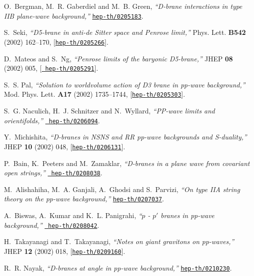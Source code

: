 \documentclass[a4paper,12pt]{article}
\numberwithin{equation}{section}
\begin{document}
\begin{thebibliography}{10}
O.~Bergman, M.~R. Gaberdiel and M.~B. Green, {\it ``{D}-brane interactions in
  type {IIB} plane-wave background,''}
  \href{http://arXiv.org/abs/hep-th/0205183}{{\tt hep-th/0205183}}.

S.~Seki, {\it ``{D}5-brane in anti-de {S}itter space and {P}enrose limit,''}
  Phys. Lett. {\bf B542} (2002) 162--170,
  [\href{http://arXiv.org/abs/hep-th/0205266}{{\tt hep-th/0205266}}].

D.~Mateos and S.~Ng, {\it ``{P}enrose limits of the baryonic {D}5-brane,''}
  JHEP {\bf 08} (2002) 005, [\href{http://arXiv.org/abs/hep-th/0205291}{{\tt
  hep-th/0205291}}].

S.~S. Pal, {\it ``Solution to worldvolume action of {D}3 brane in pp-wave
  background,''}  Mod. Phys. Lett. {\bf A17} (2002) 1735--1744,
  [\href{http://arXiv.org/abs/hep-th/0205303}{{\tt hep-th/0205303}}].

S.~G. Naculich, H.~J. Schnitzer and N.~Wyllard, {\it ``{PP}-wave limits and
  orientifolds,''}  \href{http://arXiv.org/abs/hep-th/0206094}{{\tt
  hep-th/0206094}}.

Y.~Michishita, {\it ``{D}-branes in {NSNS} and {RR} pp-wave backgrounds and
  {S}-duality,''}  JHEP {\bf 10} (2002) 048,
  [\href{http://arXiv.org/abs/hep-th/0206131}{{\tt hep-th/0206131}}].

P.~Bain, K.~Peeters and M.~Zamaklar, {\it ``{D}-branes in a plane wave from
  covariant open strings,''}  \href{http://arXiv.org/abs/hep-th/0208038}{{\tt
  hep-th/0208038}}.

M.~Alishahiha, M.~A. Ganjali, A.~Ghodsi and S.~Parvizi, {\it ``On type {IIA}
  string theory on the pp-wave background,''}
  \href{http://arXiv.org/abs/hep-th/0207037}{{\tt hep-th/0207037}}.

A.~Biswas, A.~Kumar and K.~L. Panigrahi, {\it ``{$p$ - $p'$} branes in pp-wave
  background,''}  \href{http://arXiv.org/abs/hep-th/0208042}{{\tt
  hep-th/0208042}}.

H.~Takayanagi and T.~Takayanagi, {\it ``Notes on giant gravitons on
  pp-waves,''}  JHEP {\bf 12} (2002) 018,
  [\href{http://arXiv.org/abs/hep-th/0209160}{{\tt hep-th/0209160}}].

R.~R. Nayak, {\it ``D-branes at angle in pp-wave background,''}
  \href{http://arXiv.org/abs/hep-th/0210230}{{\tt hep-th/0210230}}.


\end{thebibliography}
\end{document}
